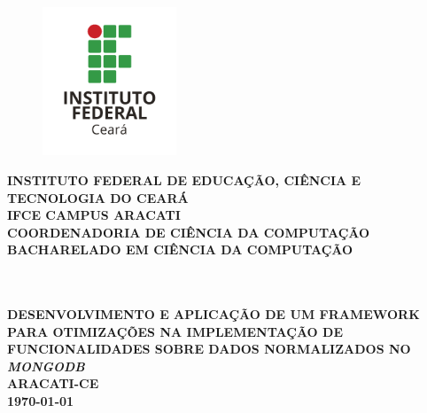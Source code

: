 \thispagestyle{empty}
\vfill
\begin{center}

\begin{figure}[t]
\centering
\includegraphics[width=4cm]{figuras/ifce-ceara.png}%
\end{figure}
\vspace{0.5 cm}
{\normalsize\bfseries INSTITUTO FEDERAL DE EDUCAÇÃO, CIÊNCIA E TECNOLOGIA DO CEARÁ} \\
{\normalsize\bfseries IFCE CAMPUS ARACATI} \\
{\normalsize\bfseries COORDENADORIA DE CIÊNCIA DA COMPUTAÇÃO}  \\ 
{\normalsize\bfseries BACHARELADO EM CIÊNCIA DA COMPUTAÇÃO}  \\ 

\vspace*{1in}
\begin{large} \bfseries \imprimirautor \end{large}\\[0.4in]

\vspace*{4cm}
\noindent \\
\large\bfseries{\uppercase{Desenvolvimento e Aplicação de um Framework para Otimizações na Implementação de Funcionalidades Sobre Dados Normalizados no \textit{MongoDB}}} \\
\vfill
\normalsize\bfseries{ARACATI-CE\\\today}

\end{center}
\normalsize